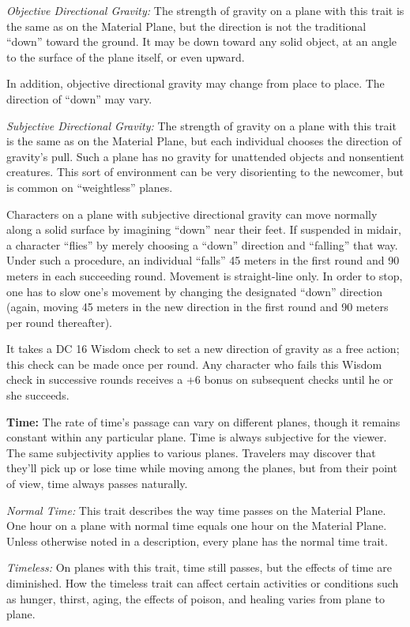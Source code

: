 \textit{Objective Directional Gravity:} The strength of gravity on a plane with this trait is the same as on the Material Plane, but the direction is not the traditional ``down'' toward the ground. It may be down toward any solid object, at an angle to the surface of the plane itself, or even upward.

In addition, objective directional gravity may change from place to place. The direction of ``down'' may vary.

\textit{Subjective Directional Gravity:} The strength of gravity on a plane with this trait is the same as on the Material Plane, but each individual chooses the direction of gravity's pull. Such a plane has no gravity for unattended objects and nonsentient creatures. This sort of environment can be very disorienting to the newcomer, but is common on ``weightless'' planes.

Characters on a plane with subjective directional gravity can move normally along a solid surface by imagining ``down'' near their feet. If suspended in midair, a character ``flies'' by merely choosing a ``down'' direction and ``falling'' that way. Under such a procedure, an individual ``falls'' 45 meters in the first round and 90 meters in each succeeding round. Movement is straight-line only. In order to stop, one has to slow one's movement by changing the designated ``down'' direction (again, moving 45 meters in the new direction in the first round and 90 meters per round thereafter).

It takes a DC 16 Wisdom check to set a new direction of gravity as a free action; this check can be made once per round. Any character who fails this Wisdom check in successive rounds receives a +6 bonus on subsequent checks until he or she succeeds.

\textbf{Time:} The rate of time's passage can vary on different planes, though it remains constant within any particular plane. Time is always subjective for the viewer. The same subjectivity applies to various planes. Travelers may discover that they'll pick up or lose time while moving among the planes, but from their point of view, time always passes naturally.

\textit{Normal Time:} This trait describes the way time passes on the Material Plane. One hour on a plane with normal time equals one hour on the Material Plane. Unless otherwise noted in a description, every plane has the normal time trait.

\textit{Timeless:} On planes with this trait, time still passes, but the effects of time are diminished. How the timeless trait can affect certain activities or conditions such as hunger, thirst, aging, the effects of poison, and healing varies from plane to plane.

